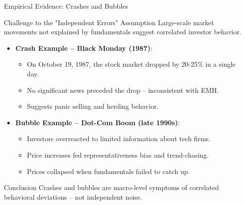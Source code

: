 \begin{frame}{Empirical Evidence: Crashes and Bubbles}
	
	\begin{block}{Challenge to the "Independent Errors" Assumption}
		Large-scale market movements not explained by fundamentals suggest correlated investor behavior.
	\end{block}
	
	\footnotesize
	\begin{itemize}
		\item \textbf{Crash Example -- Black Monday (1987)}:
		\begin{itemize}
			\item On October 19, 1987, the stock market dropped by 20-25\% in a single day.
			\item No significant news preceded the drop -- inconsistent with EMH.
			\item Suggests panic selling and herding behavior.
		\end{itemize}
		
		\item \textbf{Bubble Example -- Dot-Com Boom (late 1990s)}:
		\begin{itemize}
			\item Investors overreacted to limited information about tech firms.
			\item Price increases fed representativeness bias and trend-chasing.
			\item Prices collapsed when fundamentals failed to catch up.
		\end{itemize}
	\end{itemize}
	
	\begin{alertblock}{Conclusion}
		\footnotesize
		Crashes and bubbles are macro-level symptoms of correlated behavioral deviations -- not independent noise.
	\end{alertblock}
	
\end{frame}

